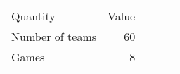 \begin{tabular}{lrrrr}
\hline\hline
Quantity & Value \\
Number of teams & 60 \\
Games & 8 \\
\hline\hline
\end{tabular}
